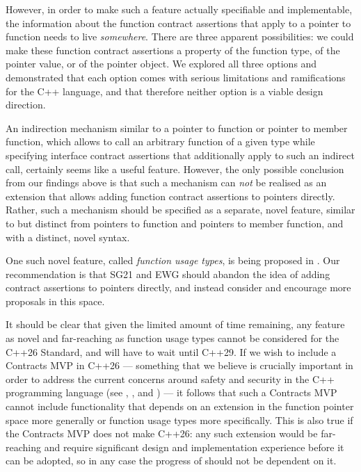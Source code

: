 However, in order to make such a feature actually specifiable and implementable, the information about the function contract assertions that apply to a pointer to function needs to live \emph{somewhere}. There are three apparent possibilities: we could make these function contract assertions a property of the function type, of the pointer value, or of the pointer object. We explored all three options and demonstrated that each option comes with serious limitations and ramifications for the C++ language, and that therefore neither option is a viable design direction.

An indirection mechanism similar to a pointer to function or pointer to member function, which allows to call an arbitrary function of a given type while specifying interface contract assertions that additionally apply to such an indirect call, certainly seems like a useful feature. However, the only possible conclusion from our findings above is that such a mechanism can \emph{not} be realised as an extension that allows adding function contract assertions to pointers directly. Rather, such a mechanism should be specified as a separate, novel feature, similar to but distinct from pointers to function and pointers to member function, and with a distinct, novel syntax.

One such novel feature, called \emph{function usage types}, is being proposed in \cite{P3271R0}. Our recommendation is that SG21 and EWG should abandon the idea of adding contract assertions to pointers directly, and instead consider \cite{P3271R0} and encourage more proposals in this space.

It should be clear that given the limited amount of time remaining, any feature as novel and far-reaching as function usage types cannot be considered for the C++26 Standard, and will have to wait until C++29. If we wish to include a Contracts MVP in C++26 --- something that we believe is crucially important in order to address the current concerns around safety and security in the C++ programming language (see \cite{P3269R0}, \cite{P3276R0}, and \cite{P3297R0}) --- it follows that such a Contracts MVP cannot include functionality that depends on an extension in the function pointer space more generally or function usage types more specifically. This is also true if the Contracts MVP does not make C++26: any such extension would be far-reaching and require significant design and implementation experience before it can be adopted, so in any case the progress of \cite{P2900R7} should not be dependent on it. 

